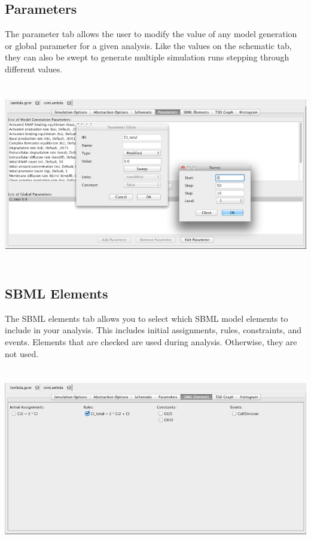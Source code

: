 \documentclass[titlepage,11pt]{article}
\begin{document}
\clearpage

\subsection{\label{AnalysisParameters}Parameters}

\noindent
The parameter tab allows the user to modify the value of any model generation or global parameter for a given analysis.  Like the values on the schematic tab, they can also be swept to generate multiple simulation runs stepping through different values.

\begin{center}
\includegraphics[height=80mm]{screenshots/parameterEditor}
\end{center}

\subsection{\label{SBMLElements}SBML Elements}

The SBML elements tab allows you to select which SBML model elements to include in your analysis.  This includes initial assignments, rules, constraints, and events.  Elements that are checked are used during analysis.  Otherwise, they are not used.

\begin{center}
\includegraphics[height=80mm]{screenshots/SBMLElements}
\end{center}
\end{document}
